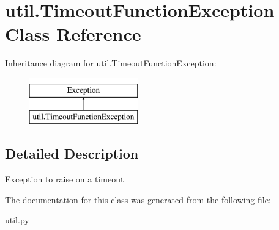 \hypertarget{classutil_1_1_timeout_function_exception}{}\section{util.\+Timeout\+Function\+Exception Class Reference}
\label{classutil_1_1_timeout_function_exception}
Inheritance diagram for util.\+Timeout\+Function\+Exception\+:\begin{figure}[H]
\begin{center}
\leavevmode
\includegraphics[height=2.000000cm]{classutil_1_1_timeout_function_exception}
\end{center}
\end{figure}


\subsection{Detailed Description}
\begin{DoxyVerb}Exception to raise on a timeout\end{DoxyVerb}
 

The documentation for this class was generated from the following file\+:\begin{DoxyCompactItemize}
\item 
util.\+py\end{DoxyCompactItemize}

